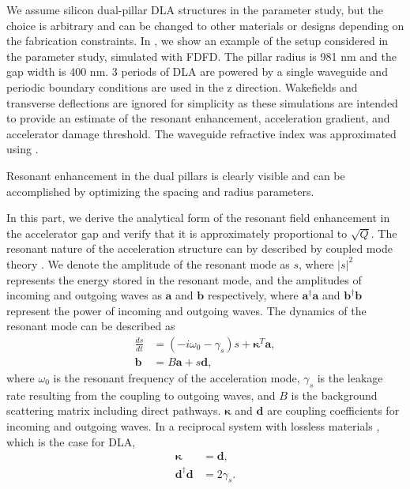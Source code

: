 We assume silicon dual-pillar DLA structures in the parameter study, but the choice is arbitrary and can be changed to other materials or designs depending on the fabrication constraints.
In , we show an example of the setup considered in the parameter study, simulated with FDFD.
The pillar radius is 981 nm and the gap width is 400 nm.
3 periods of DLA are powered by a single waveguide and periodic boundary conditions are used in the z direction.
Wakefields and transverse deflections are ignored for simplicity as these simulations are intended to provide an estimate of the resonant enhancement, acceleration gradient, and accelerator damage threshold.
The waveguide refractive index was approximated using \cite{smotrova2005cold}.

Resonant enhancement in the dual pillars is clearly visible and can be accomplished by optimizing the spacing and radius parameters.

In this part, we derive the analytical form of the resonant field enhancement in the accelerator gap and verify that it is approximately proportional to $\sqrt{Q}$. The resonant nature of the acceleration structure can by described by coupled mode theory \cite{haus1984waves, suh2004temporal}. We denote the amplitude of the resonant mode as $s$, where $|s|^2$ represents the energy stored in the resonant mode, and the amplitudes of incoming and outgoing waves as $\boldsymbol{a}$ and $\boldsymbol{b}$ respectively, where $\boldsymbol{a}^{\dagger}\boldsymbol{a}$ and $\boldsymbol{b}^{\dagger}\boldsymbol{b}$ represent the power of incoming and outgoing waves. The dynamics of the resonant mode can be described as
\begin{subequations}
\label{eq:CMT}
\begin{align}
\frac{ds}{dt} & = (-i\omega_0 - \gamma_s)s + \boldsymbol{\kappa}^T \boldsymbol{a},\\
\boldsymbol{b} & = B \boldsymbol{a} + s \boldsymbol{d},
\end{align}
\end{subequations}
where $\omega_0$ is the resonant frequency of the acceleration mode, $\gamma_s$ is the leakage rate resulting from the coupling to outgoing waves, and $B$ is the background scattering matrix including direct pathways. $\boldsymbol{\kappa}$ and $\boldsymbol{d}$ are coupling coefficients for incoming and outgoing waves. In a reciprocal system with lossless materials \cite{suh2004temporal}, which is the case for DLA,
\begin{subequations}
\label{eq:CMT_recip}
\begin{align}
\boldsymbol{\kappa} & = \boldsymbol{d}, \\
\boldsymbol{d}^{\dagger} \boldsymbol{d} & = 2 \gamma_s.
\end{align}
\end{subequations}

